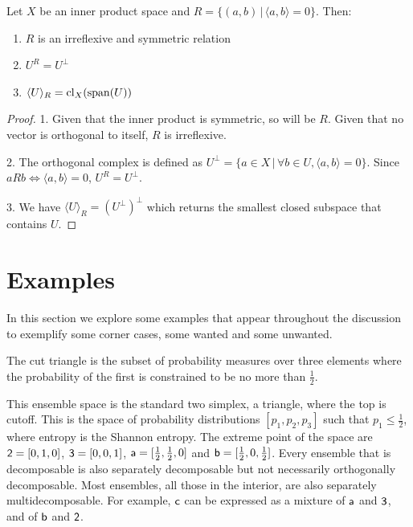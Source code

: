 \begin{mathSection}
	\begin{prop}
		Let $X$ be an inner product space and $R = \{(a,b) \,|\, \langle a , b\rangle = 0\}$. Then:
		\begin{enumerate}
			\item $R$ is an irreflexive and symmetric relation
			\item $U^{R} = U^{\perp}$
			\item $\langle U \rangle_R = \cl_X (\vspan(U))$
		\end{enumerate}
	\end{prop}
	
	\begin{proof}
		1. Given that the inner product is symmetric, so will be $R$. Given that no vector is orthogonal to itself, $R$ is irreflexive.
		
		2. The orthogonal complex is defined as $U^\perp = \{ a \in X \, | \, \forall b \in U, \langle a , b\rangle = 0 \}$. Since $aRb \iff \langle a , b\rangle = 0$, $U^{R} = U^{\perp}$.
		
		3. We have $\langle U \rangle_R = (U^{\perp})^\perp$ which returns the smallest closed subspace that contains $U$.
	\end{proof}
\end{mathSection}


\section{Examples}

In this section we explore some examples that appear throughout the discussion to exemplify some corner cases, some wanted and some unwanted.

\begin{example}\label{pm_es_cutTriangle}
	The cut triangle is the subset of probability measures over three elements where the probability of the first is constrained to be no more than $\frac{1}{2}$.
\end{example}

This ensemble space is the standard two simplex, a triangle, where the top is cutoff. This is the space of probability distributions $[p_1, p_2, p_3]$ such that $p_1 \leq \frac{1}{2}$, where entropy is the Shannon entropy. The extreme point of the space are $\ens[2] = [0,1,0]$, $\ens[3] = [0,0,1]$, $\ens[a] = [\frac{1}{2},\frac{1}{2},0]$ and $\ens[b] = [\frac{1}{2},0,\frac{1}{2}]$. Every ensemble that is decomposable is also separately decomposable but not necessarily orthogonally decomposable. Most ensembles, all those in the interior, are also separately multidecomposable. For example, $\ens[c]$ can be expressed as a mixture of $\ens[a]$ and $\ens[3]$, and of $\ens[b]$ and $\ens[2]$.


